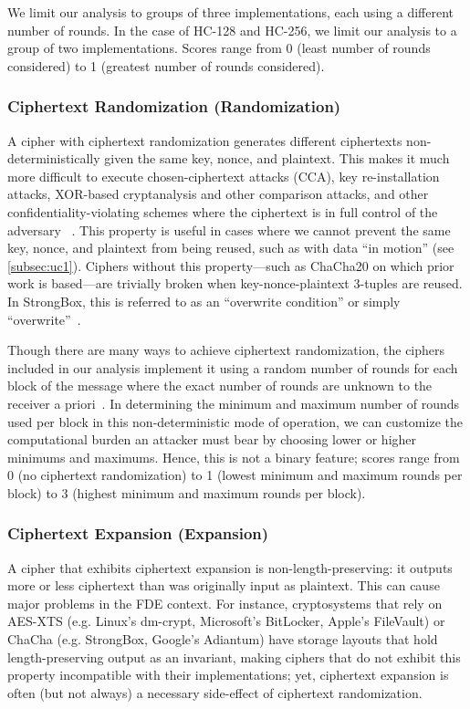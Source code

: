 We limit our analysis to groups of three implementations, each using a different
number of rounds. In the case of HC-128 and HC-256, we limit our analysis to a
group of two implementations. Scores range from 0 (least number of rounds
considered) to 1 (greatest number of rounds considered).

\subsubsection{Ciphertext Randomization (Randomization)}

A cipher with ciphertext randomization generates different ciphertexts
non-deterministically given the same key, nonce, and plaintext. This makes it
much more difficult to execute chosen-ciphertext attacks (CCA), key
re-installation attacks, XOR-based cryptanalysis and other comparison attacks,
and other confidentiality-violating schemes where the ciphertext is in full
control of the adversary ~\cite{Freestyle}. This property is useful in cases
where we cannot prevent the same key, nonce, and plaintext from being reused,
such as with data ``in motion'' (see \cref{subsec:uc1}). Ciphers without this
property---such as ChaCha20 on which prior work is based---are trivially broken
when key-nonce-plaintext 3-tuples are reused. In StrongBox, this is referred to
as an ``overwrite condition'' or simply ``overwrite''~\cite{StrongBox}.

Though there are many ways to achieve ciphertext randomization, the ciphers
included in our analysis implement it using a random number of rounds for each
block of the message where the exact number of rounds are unknown to the
receiver a priori~\cite{Freestyle}. In determining the minimum and maximum
number of rounds used per block in this non-deterministic mode of operation, we
can customize the computational burden an attacker must bear by choosing lower
or higher minimums and maximums. Hence, this is not a binary feature; scores
range from 0 (no ciphertext randomization) to 1 (lowest minimum and maximum
rounds per block) to 3 (highest minimum and maximum rounds per block).

\subsubsection{Ciphertext Expansion (Expansion)}

A cipher that exhibits ciphertext expansion is non-length-preserving: it outputs
more or less ciphertext than was originally input as plaintext. This can cause
major problems in the FDE context. For instance, cryptosystems that rely on
AES-XTS (e.g. Linux's dm-crypt, Microsoft's BitLocker, Apple's FileVault) or
ChaCha (e.g. StrongBox, Google's Adiantum) have storage layouts that hold
length-preserving output as an invariant, making ciphers that do not exhibit
this property incompatible with their implementations; yet, ciphertext expansion
is often (but not always) a necessary side-effect of ciphertext randomization.

